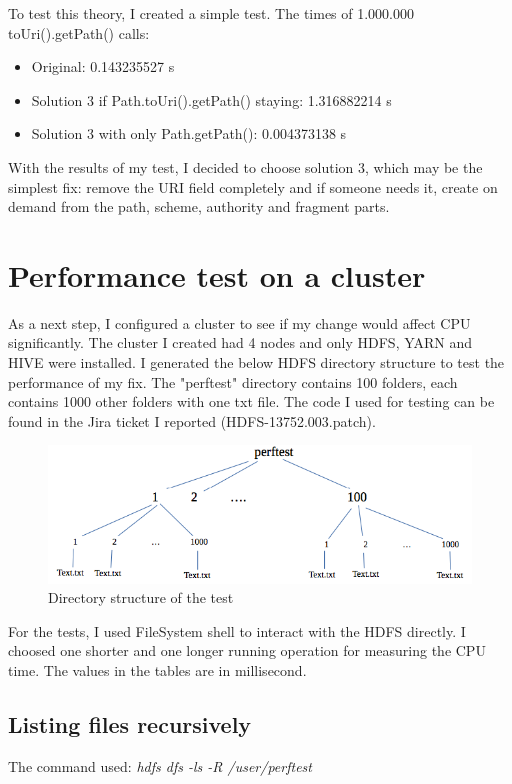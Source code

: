 To test this theory, I created a simple test. The times of 1.000.000 toUri().getPath() calls:
\begin{itemize}
	\item Original: 0.143235527 s
	\item Solution 3 if Path.toUri().getPath() staying: 1.316882214 s
	\item Solution 3 with only Path.getPath(): 0.004373138 s
\end{itemize}

With the results of my test, I decided to choose solution 3, which may be the simplest fix: remove the URI field completely and if someone needs it, create on demand from the path, scheme, authority and fragment parts.

\section{Performance test on a cluster}
As a next step, I configured a cluster to see if my change would affect CPU significantly. The cluster I created had 4 nodes and only HDFS, YARN and HIVE were installed. I generated the below HDFS directory structure to test the performance of my fix. The "perftest" directory contains 100 folders, each contains 1000 other folders with one txt file. The code I used for testing can be found in the Jira ticket I reported \cite{hdfs-path} (HDFS-13752.003.patch).

\begin{figure}[H]
	\includegraphics[width=125mm, keepaspectratio]{figures/directory_structure.png}
	\centering
	\caption{Directory structure of the test}
\end{figure}

For the tests, I used FileSystem shell to interact with the HDFS directly. I choosed one shorter and one longer running operation for measuring the CPU time. The values in the tables are in millisecond.

\subsection{Listing files recursively}
The command used:  \textit{hdfs dfs -ls -R /user/perftest}

